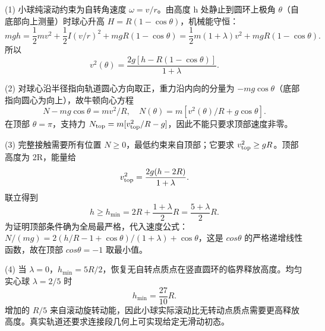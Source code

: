 (1) 小球纯滚动约束为自转角速度 \(\omega=v/r\)。由高度 h 处静止到圆环上极角 \(\theta \)（自底部向上测量）时球心升高 \(H=R(1-\cos\theta)\)，机械能守恒：
\[
mgh=\frac12mv^2+\frac12I(v/r)^2+mgR(1-\cos\theta)
=\frac12m(1+\lambda)v^2+mgR(1-\cos\theta).
\]
所以
\[
v^2(\theta)=\frac{2g[h-R(1-\cos\theta)]}{1+\lambda}.
\]

(2) 对球心沿半径指向轨道圆心方向取正，重力沿内向的分量为 \(-mg\cos\theta\)（底部指向圆心为向上），故牛顿向心方程
\[
N-mg\cos\theta=m v^2/R,\quad
N(\theta)=m[v^2(\theta)/R+g\cos\theta].
\]
在顶部 \(\theta =\pi \)，支持力 \(N_{\rm top}=m[v_{\rm top}^2/R-g]\)，因此不能只要求顶部速度非零。

(3) 完整接触需要所有位置 \(N\ge 0\)，最低约束来自顶部；它要求 \(v_{\rm top}^2\ge gR\)。顶部高度为 2R，能量给
\[
v_{\rm top}^2=\frac{2g(h-2R)}{1+\lambda}.
\]
联立得到
\[
h\ge h_{\min}=2R+\frac{1+\lambda}{2}R=\frac{5+\lambda}{2}R.
\]
为证明顶部条件确为全局最严格，代入速度公式：
\(N/(mg)=2(h/R-1+\cos\theta)/(1+\lambda)+\cos\theta\)，这是 \(cos\theta \) 的严格递增线性函数，故在顶部 \(cos\theta =-1\) 取最小值。

(4) 当 \(\lambda =0\)，\(h_{\min}=5R/2\)，恢复无自转点质点在竖直圆环的临界释放高度。均匀实心球 \(\lambda =2/5\) 时
\[
h_{\min}=\frac{27}{10}R.
\]
增加的 \(R/5\) 来自滚动旋转动能，因此小球实际滚动比无转动点质点需要更高释放高度。真实轨道还要求连接段几何上可实现给定无滑动初态。
